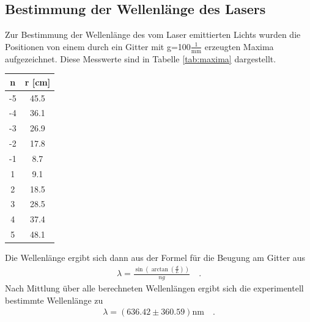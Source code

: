 \documentclass[]{scrartcl}
\begin{document}
\subsection{Bestimmung der Wellenlänge des Lasers}
Zur Bestimmung der Wellenlänge des vom Laser emittierten Lichts wurden die Positionen von einem durch ein Gitter mit g=100$\frac{1}{\si{\milli\metre}}$ erzeugten Maxima aufgezeichnet. Diese Messwerte sind in Tabelle \ref{tab:maxima} dargestellt. \\
\begin{center}
	\begin{tabular}{|c|c|}
		\hline n & r [cm] \\
		\hline -5 & 45.5 \\
		\hline -4 & 36.1 \\
		\hline -3 & 26.9 \\
		\hline -2 & 17.8 \\
		\hline -1 & 8.7 \\
		\hline 1 & 9.1 \\
		\hline 2 & 18.5 \\
		\hline 3 & 28.5 \\
		\hline 4 & 37.4 \\
		\hline 5 & 48.1 \\
		\hline
	\end{tabular}
	\label{tab:maxima}
\end{center}
Die Wellenlänge ergibt sich dann aus der Formel für die Beugung am Gitter aus
\begin{align}
\lambda = \frac{\sin\left(\arctan\left( \frac{d}{L}\right) \right) }{ng}\quad.
\end{align}
Nach Mittlung über alle berechneten Wellenlängen ergibt sich die experimentell bestimmte Wellenlänge zu
\begin{align*}
\lambda = (636.42 \pm 360.59)\si{\nano\metre}\quad.
\end{align*}
\end{document}
